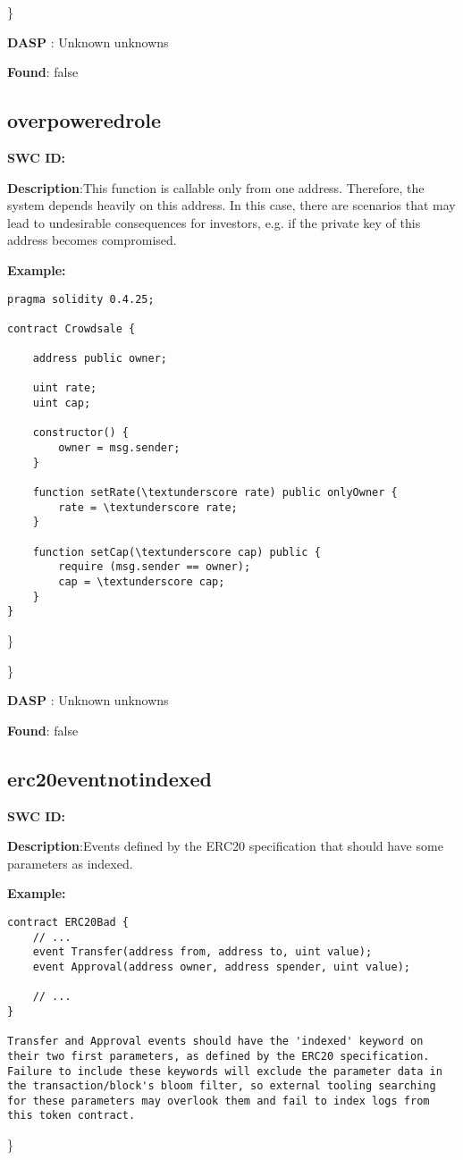 \documentclass{article}
\begin{document}
\} 

\textbf{DASP} : Unknown unknowns

\textbf{Found}: false

\subsection{overpowered\textunderscore role} 
\textbf{SWC \textunderscore ID:} 

\textbf{Description}:This function is callable only from one address. Therefore, the system depends heavily on this address. In this case, there are scenarios that may lead to undesirable consequences for investors, e.g. if the private key of this address becomes compromised.


\textbf{Example:} 
\begin{verbatim}
pragma solidity 0.4.25;

contract Crowdsale {

    address public owner;

    uint rate;
    uint cap;

    constructor() {
        owner = msg.sender;
    }

    function setRate(\textunderscore rate) public onlyOwner {
        rate = \textunderscore rate;
    }

    function setCap(\textunderscore cap) public {
        require (msg.sender == owner);
        cap = \textunderscore cap;
    }
}

\end{verbatim}\} 

\} 

\textbf{DASP} : Unknown unknowns

\textbf{Found}: false

\subsection{erc20\textunderscore event\textunderscore not\textunderscore indexed} 
\textbf{SWC \textunderscore ID:} 

\textbf{Description}:Events defined by the ERC20 specification that should have some parameters as indexed.


\textbf{Example:} 
\begin{verbatim}
contract ERC20Bad {
    // ...
    event Transfer(address from, address to, uint value);
    event Approval(address owner, address spender, uint value);

    // ...
}

Transfer and Approval events should have the 'indexed' keyword on their two first parameters, as defined by the ERC20 specification. Failure to include these keywords will exclude the parameter data in the transaction/block's bloom filter, so external tooling searching for these parameters may overlook them and fail to index logs from this token contract.

\end{verbatim}\} 
\end{document}
